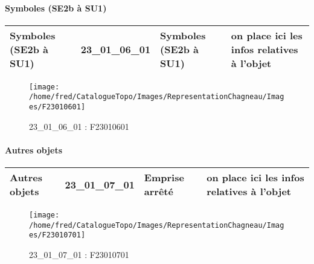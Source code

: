 \documentclass[12pt,titlepage,oneside]{book}
\begin{document}
\paragraph{Symboles (SE2b à SU1)}
\noindent
\vspace{\baselineskip}

\renewcommand{\arraystretch}{1.2}
\begin{supertabular}{|p{10cm}|c|p{13cm}|p{12cm}|}
 Symboles (SE2b à SU1) & 23\_01\_06\_01 & Symboles (SE2b à SU1) & on place ici les infos relatives à l'objet\\
\hline
\end{supertabular}
\begin{figure}[h!]
  \hfill         %
  \begin{minipage}[t]{3cm}
    \begin{center}
      \texttt{[image: /home/fred/CatalogueTopo/Images/RepresentationChagneau/Images/F23010601]}
      \caption[F23010601]{\label{} 23\_01\_06\_01 : F23010601}
    \end{center}
  \end{minipage}
\end{figure}


\paragraph{Autres objets}
\noindent
\vspace{\baselineskip}

\renewcommand{\arraystretch}{1.2}
\begin{supertabular}{|p{10cm}|c|p{13cm}|p{12cm}|}
 Autres objets & 23\_01\_07\_01 & Emprise arrêté & on place ici les infos relatives à l'objet\\
\hline
\end{supertabular}
\begin{figure}[h!]
  \hfill         %
  \begin{minipage}[t]{3cm}
    \begin{center}
      \texttt{[image: /home/fred/CatalogueTopo/Images/RepresentationChagneau/Images/F23010701]}
      \caption[F23010701]{\label{} 23\_01\_07\_01 : F23010701}
    \end{center}
  \end{minipage}
\end{figure}
\end{document}
